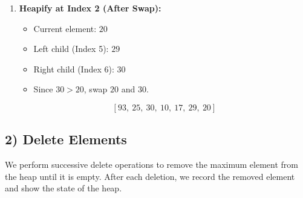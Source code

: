 \documentclass{cs1204}
\begin{document}
\begin{enumerate}[label=\textbf{\arabic*.}]
    \item \textbf{Heapify at Index 2 (After Swap):}
    \begin{itemize}
        \item Current element: \(20\)
        \item Left child (Index 5): \(29\)
        \item Right child (Index 6): \(30\)
        \item Since \(30 > 20\), swap \(20\) and \(30\).
    \end{itemize}
    \[
    [93, \ 25, \ 30, \ 10, \ 17, \ 29, \ 20]
    \]
\end{enumerate}

\subsection*{2) Delete Elements}

We perform successive delete operations to remove the maximum element from the heap until it is empty. After each deletion, we record the removed element and show the state of the heap.
\end{document}
